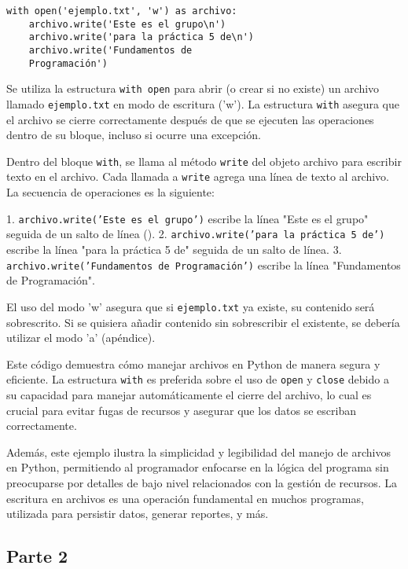 \documentclass[conference]{IEEEtran}
\begin{document}
\begin{verbatim}
with open('ejemplo.txt', 'w') as archivo:
    archivo.write('Este es el grupo\n')
    archivo.write('para la práctica 5 de\n')
    archivo.write('Fundamentos de 
    Programación')
\end{verbatim}

Se utiliza la estructura \texttt{with open} para abrir (o crear si no existe) un archivo llamado \texttt{ejemplo.txt} en modo de escritura ('w'). La estructura \texttt{with} asegura que el archivo se cierre correctamente después de que se ejecuten las operaciones dentro de su bloque, incluso si ocurre una excepción.

Dentro del bloque \texttt{with}, se llama al método \texttt{write} del objeto archivo para escribir texto en el archivo. Cada llamada a \texttt{write} agrega una línea de texto al archivo. La secuencia de operaciones es la siguiente:

1. \texttt{archivo.write('Este es el grupo\n')} escribe la línea "Este es el grupo" seguida de un salto de línea (\texttt{\n}).
2. \texttt{archivo.write('para la práctica 5 de\n')} escribe la línea "para la práctica 5 de" seguida de un salto de línea.
3. \texttt{archivo.write('Fundamentos de Programación')} escribe la línea "Fundamentos de Programación".

El uso del modo 'w' asegura que si \texttt{ejemplo.txt} ya existe, su contenido será sobrescrito. Si se quisiera añadir contenido sin sobrescribir el existente, se debería utilizar el modo 'a' (apéndice).

Este código demuestra cómo manejar archivos en Python de manera segura y eficiente. La estructura \texttt{with} es preferida sobre el uso de \texttt{open} y \texttt{close} debido a su capacidad para manejar automáticamente el cierre del archivo, lo cual es crucial para evitar fugas de recursos y asegurar que los datos se escriban correctamente.

Además, este ejemplo ilustra la simplicidad y legibilidad del manejo de archivos en Python, permitiendo al programador enfocarse en la lógica del programa sin preocuparse por detalles de bajo nivel relacionados con la gestión de recursos. La escritura en archivos es una operación fundamental en muchos programas, utilizada para persistir datos, generar reportes, y más.


\subsection{Parte 2}
\end{document}
